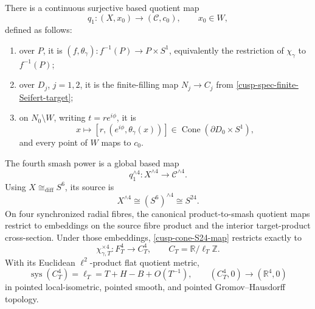 \begin{theorem}
\label{cusp-cone-S24-route}
There is a continuous surjective based quotient map
\begin{equation}
 q_1:(X,x_0)\longrightarrow(\mathcal C,c_0),\qquad x_0\in W,
 \label{cusp-cone-q1}
\end{equation}
defined as follows:
\begin{enumerate}
\item over \(P\), it is
\((f,\theta_\gamma):f^{-1}(P)\to P\times S^1\), equivalently the
restriction of \(\chi_\gamma\) to \(f^{-1}(P)\);
\item over \(D_j\), \(j=1,2\), it is the finite-filling map
\(N_j\to C_j\) from \cref{cusp-spec-finite-Seifert-target};
\item on \(N_0\setminus W\), writing \(t=re^{i\phi}\), it is
\begin{equation}
 x\longmapsto[r,(e^{i\phi},\theta_\gamma(x))]
 \in\operatorname{Cone}(\partial D_0\times S^1),
 \label{cusp-cone-q1-cusp-formula}
\end{equation}
and every point of \(W\) maps to \(c_0\).
\end{enumerate}
The fourth smash power is a global based map
\begin{equation}
 q_1^{\wedge4}:X^{\wedge4}\longrightarrow\mathcal C^{\wedge4}.
 \label{cusp-cone-S24-map}
\end{equation}
Using \(X\cong_{\mathrm{diff}}S^6\), its source is
\begin{equation}
 X^{\wedge4}\cong(S^6)^{\wedge4}\cong S^{24}.
 \label{cusp-cone-S24-source}
\end{equation}
On four synchronized radial fibres, the canonical product-to-smash quotient
maps restrict to embeddings on the source fibre product and the interior
target-product cross-section.  Under those embeddings,
\cref{cusp-cone-S24-map} restricts exactly to
\begin{equation}
 \chi_{\gamma,T}^{\times4}:F_T^4\longrightarrow C_T^4,\qquad
 C_T=\mathbb R/\ell_T\mathbb Z.
 \label{cusp-cone-S24-fibre-map}
\end{equation}
With its Euclidean \(\ell^2\)-product flat quotient metric,
\begin{equation}
 \operatorname{sys}(C_T^4)=\ell_T
 =T+H-B+O(T^{-1}),\qquad
 (C_T^4,0)\longrightarrow(\mathbb R^4,0)
 \label{cusp-cone-S24-R4-limit}
\end{equation}
in pointed local-isometric, pointed smooth, and pointed
Gromov--Hausdorff topology.


\end{theorem}
